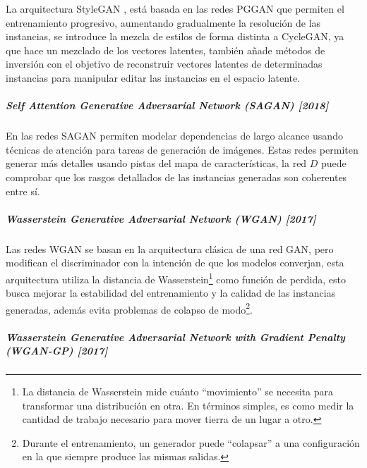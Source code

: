 La arquitectura \gls{StyleGAN} \cite{StyleGAN-melnik2023face}, está basada en las redes \gls{PGGAN} que permiten el entrenamiento progresivo, aumentando gradualmente la resolución de las instancias, se introduce la mezcla de estilos de forma distinta a \gls{CycleGAN}, ya que hace un mezclado de los vectores latentes, también añade métodos de inversión con el objetivo de reconstruir vectores latentes de determinadas instancias para manipular editar las instancias en el espacio latente.




\subparagraph*{Self Attention Generative Adversarial Network (SAGAN) [2018]}
En las redes \gls{SAGAN} \cite{SAGAN-zhang2018selfattention} permiten modelar dependencias de largo alcance usando técnicas de atención para tareas de generación de imágenes.
Estas redes permiten generar más detalles usando pistas del mapa de características, la red ${D}$ puede comprobar que los rasgos detallados de las instancias generadas son coherentes entre sí.



\subparagraph*{Wasserstein Generative Adversarial Network (WGAN) [2017]}
Las redes \gls{WGAN} \cite{WGAN-arjovsky2017wasserstein, WGAN-weng2017gan, WGAN-weng2019gan} se basan en la arquitectura clásica de una red \gls{GAN}, pero modifican el discriminador con la intención de que los modelos converjan, esta arquitectura utiliza la distancia de Wasserstein\footnote{La distancia de Wasserstein mide cuánto ``movimiento'' se necesita para transformar una distribución en otra. En términos simples, es como medir la cantidad de trabajo necesario para mover tierra de un lugar a otro.} como función de perdida, esto busca mejorar la estabilidad del entrenamiento y la calidad de las instancias generadas, además evita problemas de colapso de modo\footnote{Durante el entrenamiento, un generador puede ``colapsar'' a una configuración en la que siempre produce las mismas salidas.}.


\subparagraph*{Wasserstein Generative Adversarial Network with Gradient Penalty (WGAN-GP) [2017]}

